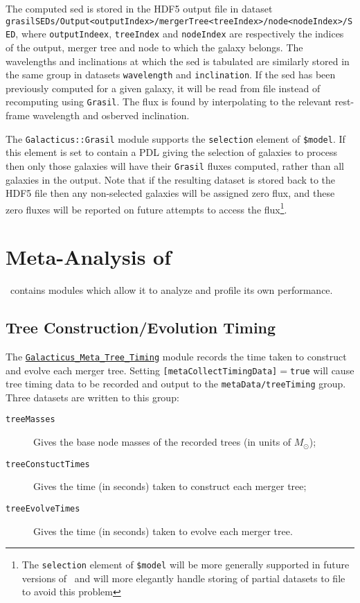 The computed \gls{sed} is stored in the HDF5 output file in dataset {\tt grasilSEDs/Output\textless outputIndex\textgreater/mergerTree\textless treeIndex\textgreater/node\textless nodeIndex\textgreater/SED}, where {\tt outputIndeex}, {\tt treeIndex} and {\tt nodeIndex} are respectively the indices of the output, merger tree and node to which the galaxy belongs. The wavelengths and inclinations at which the \gls{sed} is tabulated are similarly stored in the same group in datasets {\tt wavelength} and {\tt inclination}. If the \gls{sed} has been previously computed for a given galaxy, it will be read from file instead of recomputing using {\tt Grasil}. The flux is found by interpolating to the relevant rest-frame wavelength and osberved inclination.

The {\tt Galacticus::Grasil} module supports the {\tt selection} element of {\tt \$model}. If this element is set to contain a PDL giving the selection of galaxies to process then only those galaxies will have their {\tt Grasil} fluxes computed, rather than all galaxies in the output. Note that if the resulting dataset is stored back to the HDF5 file then any non-selected galaxies will be assigned zero flux, and these zero fluxes will be reported on future attempts to access the flux\footnote{The {\tt selection} element of {\tt \$model} will be more generally supported in future versions of \protect\glc\ and will more elegantly handle storing of partial datasets to file to avoid this problem}.

\section{Meta-Analysis of \glc}

\glc\ contains modules which allow it to analyze and profile its own performance.

\subsection{Tree Construction/Evolution Timing}\label{sec:MetaTreeTimingProfiler}

The \hyperlink{galacticus.meta.tree_timing.F90:galacticus_meta_tree_timing}{{\tt Galacticus\_Meta\_Tree\_Timing}} module records the time taken to construct and evolve each merger tree. Setting {\tt [metaCollectTimingData]}$=${\tt true} will cause tree timing data to be recorded and output to the {\tt metaData/treeTiming} group. Three datasets are written to this group:
\begin{description}
 \item[{\tt treeMasses}] Gives the base node masses of the recorded trees (in units of $M_\odot$);
 \item[{\tt treeConstuctTimes}] Gives the time (in seconds) taken to construct each merger tree;
 \item[{\tt treeEvolveTimes}] Gives the time (in seconds) taken to evolve each merger tree.
\end{description}


